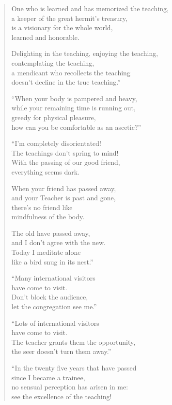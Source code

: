 \documentclass[12pt,openany]{book}%
\begin{document}
\begin{verse}
One who is learned and has memorized the teaching, \\
a keeper of the great hermit’s treasury, \\
is a visionary for the whole world, \\
learned and honorable. 

Delighting in the teaching, enjoying the teaching, \\
contemplating the teaching, \\
a mendicant who recollects the teaching \\
doesn’t decline in the true teaching.” 

“When your body is pampered and heavy, \\
while your remaining time is running out, \\
greedy for physical pleasure, \\
how can you be comfortable as an ascetic?” 

“I’m completely disorientated! \\
The teachings don’t spring to mind! \\
With the passing of our good friend, \\
everything seems dark. 

When your friend has passed away, \\
and your Teacher is past and gone, \\
there’s no friend like \\
mindfulness of the body. 

The old have passed away, \\
and I don’t agree with the new. \\
Today I meditate alone \\
like a bird snug in its nest.” 

“Many international visitors \\
have come to visit. \\
Don’t block the audience, \\
let the congregation see me.” 

“Lots of international visitors \\
have come to visit. \\
The teacher grants them the opportunity, \\
the seer doesn’t turn them away.” 

“In the twenty five years that have passed \\
since I became a trainee, \\
no sensual perception has arisen in me: \\
see the excellence of the teaching! 


\end{verse}
\end{document}
